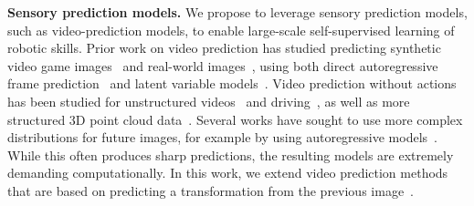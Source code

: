 \noindent \textbf{Sensory prediction models.}
We propose to leverage sensory prediction models, such as video-prediction models, to enable large-scale self-supervised learning of robotic skills. Prior work on video prediction has studied predicting synthetic video game images~\cite{atarioh,recurrentsimulators} and real-world images~\cite{bootsetal,finn_nips,video_pixel_networks}, using both direct autoregressive frame prediction~\cite{beyond_mse,finn_nips,video_pixel_networks} and latent variable models~\cite{zhang2018solar,kurutach2018learning}. Video prediction without actions has been studied for unstructured videos~\cite{beyond_mse,convlstm,vondrick} and driving~\cite{prednet,dynamic_filter_networks}, as well as more structured 3D point cloud data~\cite{se3}. Several works have sought to use more complex distributions for future images, for example by using autoregressive models~\cite{video_pixel_networks,scott_reed}. While this often produces sharp predictions, the resulting models are extremely demanding computationally. In this work, we extend video prediction methods that are based on predicting a transformation from the previous image~\cite{finn_nips,dynamic_filter_networks}. 

